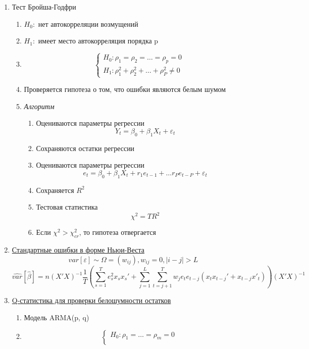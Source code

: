 \documentclass[a4paper, 12pt]{article}
\begin{document}
\begin{enumerate}
    \item Тест Бройша-Годфри
    \begin{enumerate}
        \item $H_0: $ нет автокорреляции возмущений
        \item $H_1: $ имеет место автокорреляция порядка p
        \item \[\begin{cases}
            H_0: \rho_1 = \rho_2 = \ldots = \rho_p = 0 \\
            H_1: \rho^{2}_{1} + \rho^{2}_{2} + \ldots + \rho^{2}_{P} \neq 0
        \end{cases}\]
        \item Проверяется гипотеза о том, что ошибки являются белым шумом
        \item \textit{Алгоритм}
        \begin{enumerate}
            \item Оцениваются параметры регрессии
            \[Y_t = \beta_{0} + \beta_{1}X_{t} + \varepsilon_t\]
            \item Сохраняются остатки регрессии
            \item Оцениваются параметры регрессии
            \[e_t = \beta_0 + \beta_1 X_t + r_1 e_{t - 1} + \ldots r_{P}e_{t - P} + \varepsilon_{t}\]
            \item Сохраняется $R^2$
            \item Тестовая статистика \[\chi^{2} = TR^{2}\]
            \item Если $\chi^{2} > \chi^{2}_{cr}$, то гипотеза отвергается
        \end{enumerate}
    \end{enumerate}
    \item \underline{Стандартные ошибки в форме Ньюи-Веста}
    \[var[\varepsilon] \sim \Omega = (w_{ij}), w_{ij} = 0, |i - j| > L\]
    \[\hat{var}[\hat{\beta}] = n(X'X)^{-1}\frac{1}{T}(\sum_{s = 1}^{T}e_{s}^{2}x_{s}x_{s}' + \sum_{j = 1}^{L} \sum_{t = j + 1}^{T} w_{j}e_{t}e_{t - j}(x_t x_{t - j}' + x_{t - j}x'_{t}))(X'X)^{-1}\]
    \item \underline{Q-статистика для проверки белошумности остатков}
    \begin{enumerate}
        \item Модель ARMA(p, q)
        \item \[
            \begin{cases}
                    H_0: \rho_1 = \ldots = \rho_m = 0 \\

\end{cases}\]
\end{enumerate}
\end{enumerate}
\end{document}
